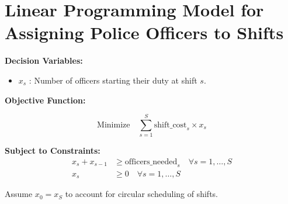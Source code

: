 \documentclass{article}
\begin{document}
\section*{Linear Programming Model for Assigning Police Officers to Shifts}

\textbf{Decision Variables:}
\begin{itemize}
    \item \( x_s \) : Number of officers starting their duty at shift \( s \).
\end{itemize}

\textbf{Objective Function:}

\[
\text{Minimize} \quad \sum_{s=1}^{S} \text{shift\_cost}_s \times x_s
\]

\textbf{Subject to Constraints:}
\begin{align*}
 x_s + x_{s-1} & \geq \text{officers\_needed}_s \quad \forall s = 1, \ldots, S \\
 x_s & \geq 0 \quad \forall s = 1, \ldots, S
\end{align*}

Assume \( x_0 = x_S \) to account for circular scheduling of shifts.
\end{document}
